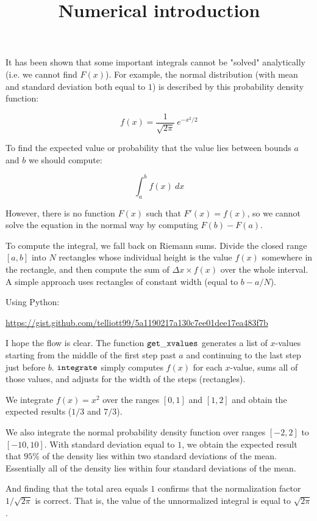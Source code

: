 \documentclass[11pt, oneside]{article}
\title{Numerical introduction}
\date{}
\begin{document}
\maketitle
\Large

It has been shown that some important integrals cannot be "solved" analytically (i.e.  we cannot find $F(x)$).  For example, the normal distribution (with mean and standard deviation both equal to $1$) is described by this probability density function:

\[ f(x) = \frac{1}{\sqrt{2 \pi}} \ e^{-x^2/2} \]

To find the expected value or probability that the value lies between bounds $a$ and $b$ we should compute:

\[  \int_a^b f(x) \ dx \]

However, there is no function $F(x)$ such that $F'(x) = f(x)$, so we cannot solve the equation in the normal way by computing $F(b) - F(a)$.

To compute the integral, we fall back on Riemann sums.  Divide the closed range $[a,b]$ into $N$ rectangles whose individual height is the value $f(x)$ somewhere in the rectangle, and then compute the sum of $\Delta x \times f(x)$ over the whole interval.  A simple approach uses rectangles of constant width (equal to $b-a/N$).

Using Python:

\url{https://gist.github.com/telliott99/5a1190217a130c7ee01dee17ea483f7b}

I hope the flow is clear.  The function $\tt{get\_xvalues}$ generates a list of $x$-values starting from the middle of the first step past $a$ and continuing to the last step just before $b$.  $\tt{integrate}$ simply computes $f(x)$ for each $x$-value, sums all of those values, and adjusts for the width of the steps (rectangles).

We integrate $f(x) = x^2$ over the ranges $[0,1]$ and $[1,2]$ and obtain the expected results ($1/3$ and $7/3$).

We also integrate the normal probability density function over ranges $[-2,2]$ to $[-10,10]$.  With standard deviation equal to $1$, we obtain the expected result that $95 \%$ of the density lies within two standard deviations of the mean.  Essentially all of the density lies within four standard deviations of the mean.

And finding that the total area equals $1$ confirms that the normalization factor $1/\sqrt{2 \pi}$ is correct.  That is, the value of the unnormalized integral is equal to $\sqrt{2 \pi}$.
\end{document}
